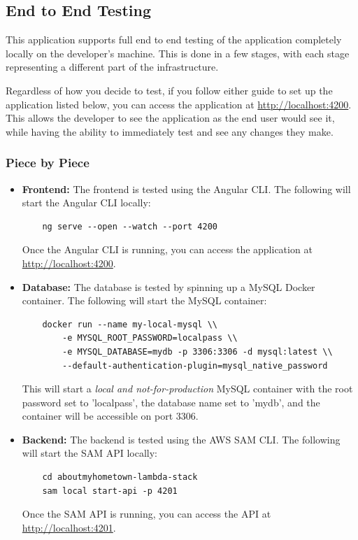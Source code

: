 \documentclass[12pt]{article}
\begin{document}
\subsection{End to End Testing}

This application supports full end to end testing of the application completely locally on the developer's machine. This is done in a few stages, with each stage representing a different part of the infrastructure.

Regardless of how you decide to test, if you follow either guide to set up the application listed below, you can access the application at \url{http://localhost:4200}. This allows the developer to see the application as the end user would see it, while having the ability to immediately test and see any changes they make.

\subsubsection{Piece by Piece}
\begin{itemize}
    \item \textbf{Frontend:} The frontend is tested using the Angular CLI. The following will start the Angular CLI locally:

          \begin{verbatim}
    ng serve --open --watch --port 4200
          \end{verbatim}

          Once the Angular CLI is running, you can access the application at \url{http://localhost:4200}.

    \item \textbf{Database:} The database is tested by spinning up a MySQL Docker container. The following will start the MySQL container:

          \begin{verbatim}
    docker run --name my-local-mysql \\
        -e MYSQL_ROOT_PASSWORD=localpass \\
        -e MYSQL_DATABASE=mydb -p 3306:3306 -d mysql:latest \\
        --default-authentication-plugin=mysql_native_password
        \end{verbatim}

          This will start a \textit{local and not-for-production} MySQL container with the root password set to 'localpass', the database name set to 'mydb', and the container will be accessible on port 3306.

    \item \textbf{Backend:} The backend is tested using the AWS SAM CLI. The following will start the SAM API locally:

          \begin{verbatim}
    cd aboutmyhometown-lambda-stack
    sam local start-api -p 4201
          \end{verbatim}

          Once the SAM API is running, you can access the API at \url{http://localhost:4201}.
\end{itemize}
\end{document}
